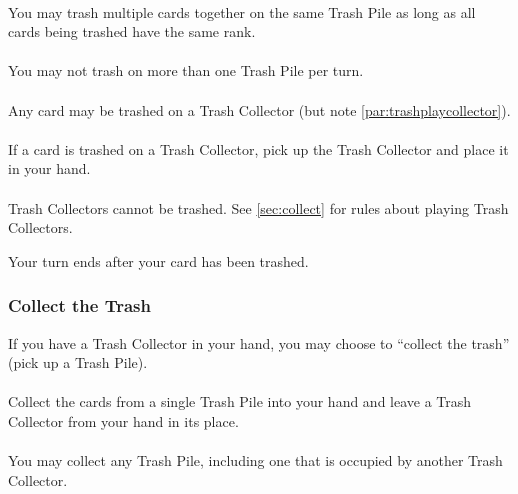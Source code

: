 \documentclass{article}
\begin{document}
\paragraph{} \label{par:trashmultiple}
You may trash multiple cards together on the same Trash Pile as long as all cards being trashed have the same rank.

\paragraph{} \label{par:trashmultiplepiles}
You may not trash on more than one Trash Pile per turn.

\paragraph{} \label{par:trashwild}
Any card may be trashed on a Trash Collector (but note \autoref{par:trashplaycollector}).

\paragraph{} \label{par:trashplayoncollector}
If a card is trashed on a Trash Collector, pick up the Trash Collector and place it in your hand.

\paragraph{} \label{par:trashplaycollector}
Trash Collectors cannot be trashed. See \autoref{sec:collect} for rules about playing Trash Collectors.

Your turn ends after your card has been trashed.

\subsubsection{Collect the Trash}
\label{sec:collect}

If you have a Trash Collector in your hand, you may choose to ``collect the trash'' (pick up a Trash Pile).

\paragraph{} \label{par:collectplay}
Collect the cards from a single Trash Pile into your hand and leave a Trash Collector from your hand in its place.

\paragraph{} \label{par:collectcollector}
You may collect any Trash Pile, including one that is occupied by another Trash Collector.
\end{document}
